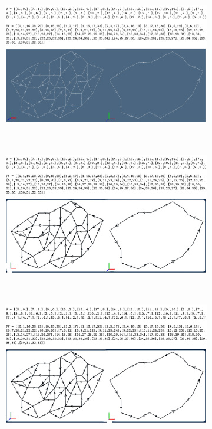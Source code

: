 \documentclass[]{egpubl}
\begin{document}
 \begin{figure}[!h]
  \centering
  \begin{subfigure}[b]{\linewidth}
  \includegraphics[width=\textwidth]{images/minimum-data}
  \end{subfigure}
 \\
  \begin{subfigure}[b]{0.48\linewidth}
  \includegraphics[width=\textwidth]{images/minimum-colors-a}
  \caption{}
  \vspace*{4mm}
  \end{subfigure}
  ~
  \begin{subfigure}[b]{0.48\linewidth}
  \includegraphics[width=\textwidth]{images/minimum-colors-b}

\end{subfigure}
\end{figure}
\end{document}
